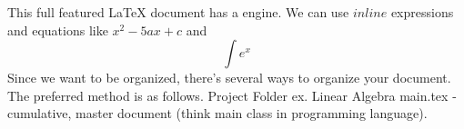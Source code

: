 \markdownRendererUlBegin
\markdownRendererUlItem This full featured LaTeX document has a  engine.\markdownRendererUlItemEnd 
\markdownRendererUlItem We can use $inline$ expressions and equations like $x^2-5ax+c$ and $$\int e^x$$\markdownRendererUlItemEnd 
\markdownRendererUlEnd \markdownRendererInterblockSeparator
{}\markdownRendererInterblockSeparator
{}Since we want to be organized, there's several ways to organize your document. The preferred method is as follows.\markdownRendererInterblockSeparator
{}\markdownRendererUlBeginTight
\markdownRendererUlItem Project Folder ex. Linear Algebra\markdownRendererInterblockSeparator
{}\markdownRendererUlBeginTight
\markdownRendererUlItem main.tex - cumulative, master document (think main class in programming language).\markdownRendererUlItemEnd 
\markdownRendererUlEndTight \markdownRendererUlItemEnd 
\markdownRendererUlEndTight \relax